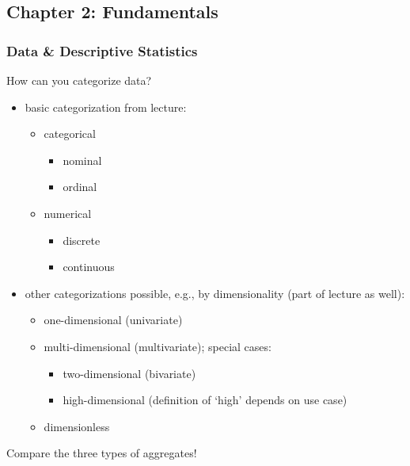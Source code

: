 \documentclass[12pt]{article}
\begin{document}
\subsection*{Chapter 2: Fundamentals}

\subsubsection*{Data \& Descriptive Statistics}

\begin{question}
	How can you categorize data?
\end{question}

\begin{itemize}[left=0pt, nosep]
	\item basic categorization from lecture:
	\begin{itemize}[left=0pt, nosep]
		\item categorical
		\begin{itemize}[left=0pt, nosep]
			\item nominal
			\item ordinal
		\end{itemize}
		\item numerical
		\begin{itemize}[left=0pt, nosep]
			\item discrete
			\item continuous
		\end{itemize}
	\end{itemize}
	\item other categorizations possible, e.g., by dimensionality (part of lecture as well):
	\begin{itemize}[left=0pt, nosep]
		\item one-dimensional (univariate)
		\item multi-dimensional (multivariate); special cases:
		\begin{itemize}[left=0pt, nosep]
			\item two-dimensional (bivariate)
			\item high-dimensional (definition of `high' depends on use case)
		\end{itemize}
		\item dimensionless
	\end{itemize}
\end{itemize}

\begin{question}
	Compare the three types of aggregates!
\end{question}
\end{document}
